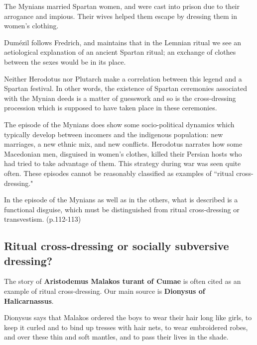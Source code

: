 \begin{rmk}
    The Mynians married Spartan women, and were cast into prison due to their arrogance and impious. Their wives helped them escape by dressing them in women's clothing.

    Dum\'{e}zil follows Fredrich, and maintains that in the Lemnian ritual we see an aetiological explanation of an ancient Spartan ritual; an exchange of clothes between the sexes would be in its place.
\end{rmk}

Neither Herodotus nor Plutarch make a correlation between this legend and a Spartan festival. In other words, the existence of Spartan ceremonies associated with the Mynian deeds is a matter of guesswork and so is the cross-dressing procession which is supposed to have taken place in these ceremonies.

The episode of the Mynians does show some socio-political dynamics which typically develop between incomers and the indigenous population: new marriages, a new ethnic mix, and new conflicts. Herodotus narrates how some Macedonian men, disguised in women's clothes, killed their Persian hosts who had tried to take advantage of them. This strategy during war was seen quite often. These episodes cannot be reasonably classified as examples of ``ritual cross-dressing."

\begin{rmk}
    In the episode of the Mynians as well as in the others, what is described is a functional disguise, which must be distinguished from ritual cross-dressing or transvestism. (p.112-113)
\end{rmk}


\subsection{Ritual cross-dressing or socially subversive dressing?}

The story of \textbf{Aristodemus Malakos turant of Cumae} is often cited as an example of ritual cross-dressing. Our main source is \textbf{Dionysus of Halicarnassus}.

\begin{rmk}
    Dionysus says that Malakos ordered the boys to wear their hair long like girls, to keep it curled and to bind up tresses with hair nets, to wear embroidered robes, and over these thin and soft mantles, and to pass their lives in the shade.
\end{rmk}

